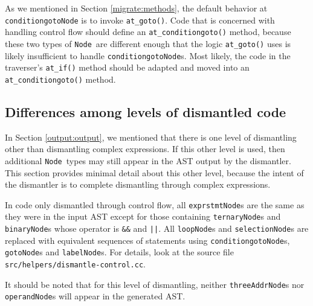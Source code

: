 \documentclass{article}
\newcommand{\node}{\texttt{Node}}
\begin{document}
As we mentioned in Section \ref{migrate:methods}, the default behavior at
\texttt{conditiongotoNode} is to invoke \texttt{at\_goto()}.  Code
that is concerned with handling control flow should define an
\texttt{at\_conditiongoto()} method, because these two types of \node\ are
different enough that the logic \texttt{at\_goto()} uses is likely
insufficient to handle \texttt{conditiongotoNode}s.  Most likely, the
code in the traverser's \texttt{at\_if()} method should be adapted and moved
into an \texttt{at\_conditiongoto()} method.

\subsection{\label{migrate:other} Differences among levels of dismantled code}

In Section \ref{output:output}, we mentioned that there is one level
of dismantling other than dismantling complex expressions.  If this
other level is used, then additional \node\ types may still appear in
the AST output by the dismantler.  This section provides minimal
detail about this other level, because the intent of the
dismantler is to complete dismantling through complex expressions.

In code only dismantled through control flow, all \texttt{exprstmtNode}s
are the same as they were in the input AST except for those containing 
\texttt{ternaryNode}s and \texttt{binaryNode}s whose operator is 
\texttt{\&\&} and \texttt{||}.  All \texttt{loopNode}s and 
\texttt{selectionNode}s are replaced with equivalent sequences of statements
using \texttt{conditiongotoNode}s, \texttt{gotoNode}s and 
\texttt{labelNode}s.  For details, look at the source file
\texttt{src/helpers/dismantle-control.cc}.

It should be noted that for this level of dismantling, neither
\texttt{threeAddrNode}s nor \texttt{operandNode}s will appear in the
generated AST.
\end{document}
